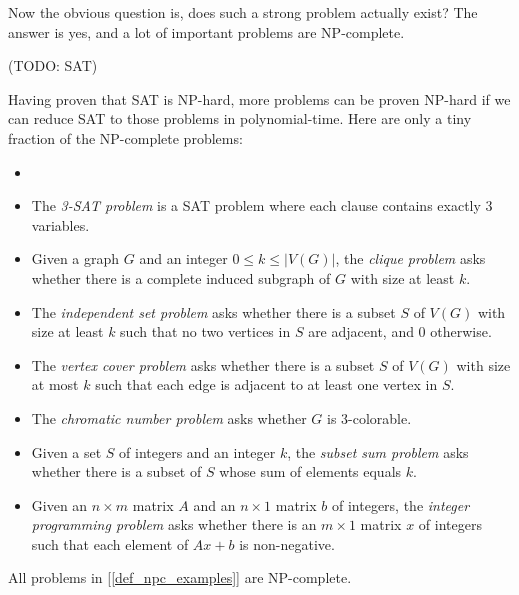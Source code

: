     Now the obvious question is, does such a strong problem actually exist? The answer is yes, and a lot of important problems are NP-complete.
        
    (TODO: SAT)
        
    Having proven that SAT is NP-hard, more problems can be proven NP-hard if we can reduce SAT to those problems in polynomial-time. Here are only a tiny fraction of the NP-complete problems:
        
    \begin{defn} \label{def_npc_examples} \begin{itemize}
        \item[]
        \item The \emph{3-SAT problem} is a SAT problem where each clause contains exactly 3 variables.
        \item Given a graph $G$ and an integer $0 \leq k \leq |V(G)|$, the \emph{clique problem} asks whether there is a complete induced subgraph of $G$ with size at least $k$.
        \item The \emph{independent set problem} asks whether there is a subset $S$ of $V(G)$ with size at least $k$ such that no two vertices in $S$ are adjacent, and 0 otherwise.
        \item The \emph{vertex cover problem} asks whether there is a subset $S$ of $V(G)$ with size at most $k$ such that each edge is adjacent to at least one vertex in $S$.
        \item The \emph{chromatic number problem} asks whether $G$ is 3-colorable.
        \item Given a set $S$ of integers and an integer $k$, the \emph{subset sum problem} asks whether there is a subset of $S$ whose sum of elements equals $k$.
        \item Given an $n \times m$ matrix $A$ and an $n \times 1$ matrix $b$ of integers, the \emph{integer programming problem} asks whether there is an $m \times 1$ matrix $x$ of integers such that each element of $Ax+b$ is non-negative.
    \end{itemize} \end{defn}
        
    \begin{thm} \label{thm_npc_examples}
        All problems in [\ref{def_npc_examples}] are NP-complete.
    \end{thm}
        

